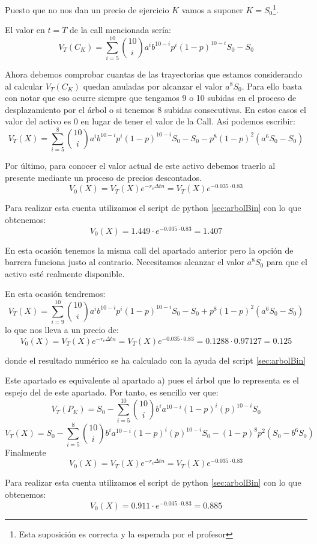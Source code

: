 \begin{problem}[2]
Puesto que no nos dan un precio de ejercicio $K$ vamos a suponer $K=S_0$\footnote{Esta suposición es correcta y la esperada por el profesor}.

El valor en $t=T$ de la call mencionada sería:
\[V_T(C_K) = \sum_{i=5}^{10}{10 \choose i}a^{i}b^{10-i}p^i(1-p)^{10-i}S_0-S_0\]

Ahora debemos comprobar cuantas de las trayectorias que estamos considerando al calcular $V_T(C_K)$ quedan anuladas por alcanzar el valor $a^8S_0$. Para ello basta con notar que eso ocurre siempre que tengamos 9 o 10 subidas en el proceso de desplazamiento por el árbol o si tenemos 8 subidas consecutivas. En estos casos el valor del activo es 0 en lugar de tener el valor de la Call. Así podemos escribir:
\[V_T(X)=\sum_{i=5}^{8}{10 \choose i}a^{i}b^{10-i}p^i(1-p)^{10-i}S_0-S_0-p^8(1-p)^2(a^6S_0-S_0)\]

Por último, para conocer el valor actual de este activo debemos traerlo al presente mediante un proceso de precios descontados.
\[V_0(X)=V_T(X)e^{-r_cΔtn}=V_T(X)e^{-0.035\cdot 0.83}\]

Para realizar esta cuenta utilizamos el script de python \ref{sec:arbolBin} con lo que obtenemos:
\[V_0(X) = 1.449\cdot e^{-0.035\cdot 0.83} = 1.407\]

\spart

En esta ocasión tenemos la misma call del apartado anterior pero la opción de barrera funciona justo al contrario. Necesitamos alcanzar el valor $a^8S_0$ para que el activo esté realmente disponible.

En esta ocasión tendremos:
\[V_T(X)=\sum_{i=9}^{10}{10 \choose i}a^{i}b^{10-i}p^i(1-p)^{10-i}S_0-S_0+p^8(1-p)^2(a^6S_0-S_0)\]
lo que nos lleva a un precio de:
\[V_0(X)=V_T(X)e^{-r_cΔtn}=V_T(X)e^{-0.035\cdot 0.83} = 0.1288 \cdot 0.97127 = 0.125\]

donde el resultado numérico se ha calculado con la ayuda del script \ref{sec:arbolBin}

\spart

Este apartado es equivalente al apartado a) pues el árbol que lo representa es el espejo del de este apartado. Por tanto, es sencillo ver que:
\[V_T(P_K) = S_0 -\sum_{i=5}^{10}{10 \choose i}b^{i}a^{10-i}(1-p)^i(p)^{10-i}S_0\]
\[V_T(X) = S_0 -\sum_{i=5}^{8}{10 \choose i}b^{i}a^{10-i}(1-p)^i(p)^{10-i}S_0-(1-p)^8p^2(S_0-b^6S_0)\]
Finalmente
\[V_0(X)=V_T(X)e^{-r_cΔtn}=V_T(X)e^{-0.035\cdot 0.83}\]

Para realizar esta cuenta utilizamos el script de python \ref{sec:arbolBin} con lo que obtenemos:
\[V_0(X) = 0.911\cdot e^{-0.035\cdot 0.83} = 0.885\]


\end{problem}
